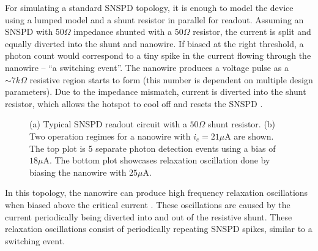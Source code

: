 For simulating a standard SNSPD topology, it is enough to model the device using a lumped model
and a shunt resistor in parallel for readout.
Assuming an SNSPD with $50\Omega$ impedance shunted with a $50\Omega$ resistor, the current is split and equally diverted into the shunt and nanowire.
If biased at the right threshold, a photon count would correspond to a tiny spike in 
the current flowing through the nanowire -- ``a switching event''. The nanowire 
produces a voltage pulse as a $\sim 7k\Omega$ resistive region starts to form 
(this number is dependent on
multiple design parameters). Due to the impedance mismatch,
current is diverted into the shunt resistor, which allows the hotspot to cool off
and resets the SNSPD \cite{toomey_thesis}.


\begin{figure}
    \centering
    \caption{(a) Typical SNSPD readout circuit with a $50\Omega$ shunt resistor. (b)
    Two operation regimes for a nanowire with $i_c=21\mu$A are shown. The top plot 
    is 5 separate photon detection events using a bias of $18\mu$A. The bottom plot
    showcases relaxation oscillation done by biasing the nanowire with $25\mu$A.}
    \label{fig:typical}
\end{figure}

In this topology, the nanowire can produce high frequency relaxation
oscillations when biased above the critical current \cite{relaxation_oscillations}.
These oscillations are caused by the
current periodically being diverted into and out of the resistive shunt. 
These relaxation oscillations consist of periodically repeating SNSPD spikes, 
similar to a switching event.

